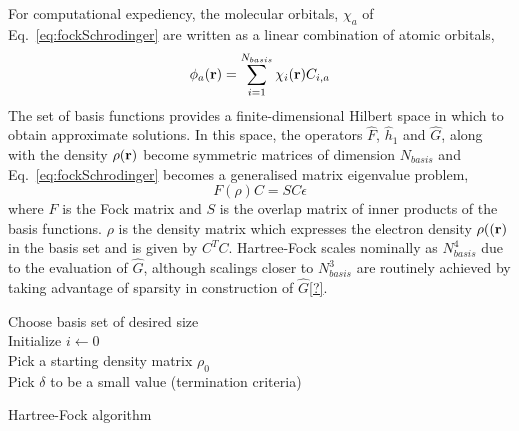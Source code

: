 \documentclass[twoside,11pt]{article}
\begin{document}
For computational expediency, the molecular orbitals, $\chi_a$ of Eq.~\ref{eq:fockSchrodinger} are written as a linear combination of atomic orbitals,
\begin{equation}\label{eq:lcao}
\phi_a({\bf r}) = \sum_{i=1}^{N_{basis}} \chi_i({\bf r}) C_{i,a}
\end{equation}
The set of basis functions provides a finite-dimensional Hilbert space in which to obtain approximate solutions. In this space, the operators $\hat{F}$, $\hat{h}_1$ and $\hat{G}$, along with the density $\rho({\bf r})$ become symmetric matrices of dimension $N_{basis}$ and Eq.~\ref{eq:fockSchrodinger} becomes a generalised matrix eigenvalue problem,
\begin{equation}\label{eq:fockMatrix}
F(\rho)C = SC\epsilon
\end{equation}
where $F$ is the Fock matrix and $S$ is the overlap matrix of inner products of the basis functions. $\rho$ is the density matrix which expresses the electron density $\rho(({\bf r})$ in the basis set and is given by $C^TC$. Hartree-Fock scales nominally as $N_{basis}^4$ due to the evaluation of $\hat{G}$, although scalings closer to $N_{basis}^3$ are routinely achieved by taking advantage of sparsity in construction of $\hat{G}$\ref{?}.


\begin{algorithm}[htb]
	Choose basis set of desired size \\
	Initialize $i \leftarrow	 0$ \\	
	Pick a starting density matrix $\rho_0$ \\
	Pick $\delta$ to be a small value (termination criteria) \\
 \caption{Hartree-Fock algorithm}
\label{alg:hf}
\end{algorithm}
\end{document}
